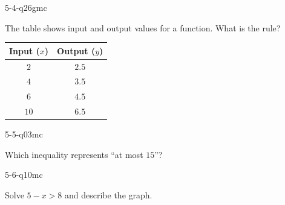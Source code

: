 \begin{practiceQuestion}{5-4-q26}{gmc}
\begin{questionText}
The table shows input and output values for a function. What is the rule?

\begin{center}
\begin{tabular}{|c|c|}
\hline
\textbf{Input ($x$)} & \textbf{Output ($y$)} \\
\hline
$2$ & $2.5$ \\
\hline
$4$ & $3.5$ \\
\hline
$6$ & $4.5$ \\
\hline
$10$ & $6.5$ \\
\hline
\end{tabular}
\end{center}
\end{questionText}
\end{practiceQuestion}

\begin{practiceQuestion}{5-5-q03}{mc}
\begin{questionText}
Which inequality represents ``at most $15$''?
\end{questionText}
\end{practiceQuestion}

\begin{practiceQuestion}{5-6-q10}{mc}
\begin{questionText}
Solve $5 - x > 8$ and describe the graph.
\end{questionText}
\end{practiceQuestion}

